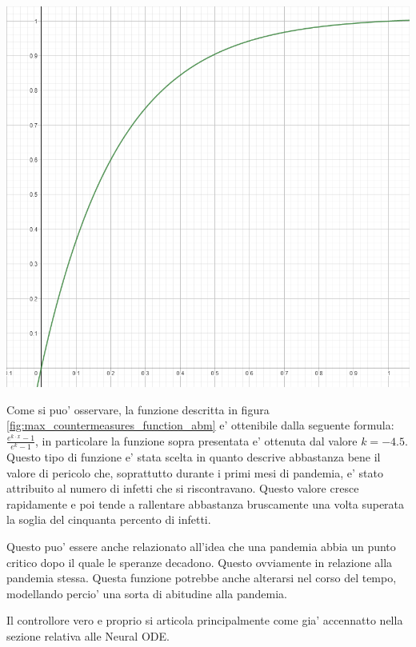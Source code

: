 \begin{minipage}{\linewidth}
	\centering
	\includegraphics[width=\textwidth]{img/activationfunction_controller.png}
	\label{fig:max_countermeasures_function_abm}
\end{minipage}

Come si puo' osservare, la funzione descritta in figura \ref{fig:max_countermeasures_function_abm} 
e' ottenibile dalla seguente formula: $\frac{e^{k \cdot x}-1}{e^{k}-1}$, in particolare la funzione sopra 
presentata e' ottenuta dal valore $k = -4.5$. Questo tipo di funzione e' stata scelta in quanto descrive abbastanza 
bene il valore di pericolo che, soprattutto durante i primi mesi di pandemia, e' stato attribuito al numero di infetti che 
si riscontravano. Questo valore cresce rapidamente e poi tende a rallentare abbastanza bruscamente una volta superata la 
soglia del cinquanta percento di infetti. 

Questo puo' essere anche relazionato all'idea che una pandemia abbia un punto critico dopo il quale le speranze decadono. Questo 
ovviamente in relazione alla pandemia stessa. Questa funzione potrebbe anche alterarsi nel corso del tempo, modellando percio' 
una sorta di abitudine alla pandemia. 

Il controllore vero e proprio si articola principalmente come gia' accennatto nella sezione relativa alle Neural ODE. 


